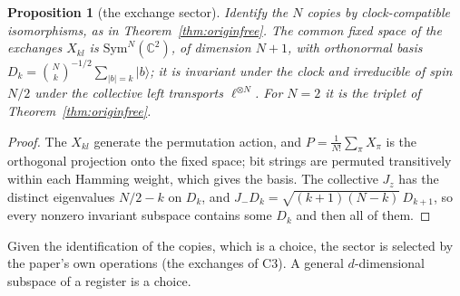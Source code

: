 \documentclass[aps,pra,onecolumn,superscriptaddress,nofootinbib,10pt]{revtex4-2}
\newtheorem{proposition}[theorem]{Proposition}
\theoremstyle{definition}
\theoremstyle{remark}
\newcommand{\C}{\mathbb{C}}
\begin{document}
\begin{proposition}[the exchange sector]\label{prop:symsector}
Identify the $N$ copies by clock-compatible isomorphisms, as in Theorem~\ref{thm:originfree}.  The common fixed
space of the exchanges $X_{kl}$ is $\mathrm{Sym}^N(\C^2)$, of dimension $N+1$, with orthonormal basis
$D_k=\binom Nk^{-1/2}\sum_{\lvert b\rvert=k}\lvert b\rangle$; it is invariant under the clock and irreducible of spin $N/2$ under the
collective left transports $\ell^{\otimes N}$.  For $N=2$ it is the triplet of Theorem~\ref{thm:originfree}.
\end{proposition}
\begin{proof}
The $X_{kl}$ generate the permutation action, and $P=\frac1{N!}\sum_\pi X_\pi$ is the orthogonal projection onto the
fixed space; bit strings are permuted transitively within each Hamming weight, which gives the basis.  The
collective $J_z$ has the distinct eigenvalues $N/2-k$ on $D_k$, and $J_-D_k=\sqrt{(k+1)(N-k)}\,D_{k+1}$, so every
nonzero invariant subspace contains some $D_k$ and then all of them.
\end{proof}
Given the identification of the copies, which is a choice, the sector is selected by the paper's own
operations (the exchanges of C3).  A general $d$-dimensional subspace of a register is a choice.
\end{document}
